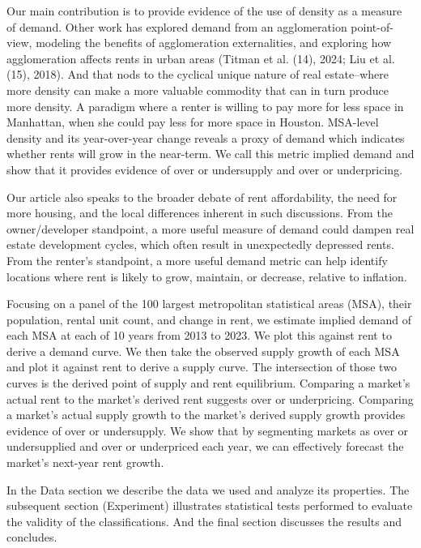 \documentclass[sn-mathphys-num]{sn-jnl}%
\theoremstyle{thmstyleone}%
\theoremstyle{thmstyletwo}%
\theoremstyle{thmstylethree}%
\begin{document}
   

Our main contribution is to provide evidence of the use of density as a measure of demand. Other work has explored demand from an agglomeration point-of-view, modeling the benefits of agglomeration externalities, and exploring how agglomeration affects rents in urban areas (Titman et al. (14), 2024; Liu et al. (15), 2018). And that nods to the cyclical unique nature of real estate--where more density can make a more valuable commodity that can in turn produce more density. A paradigm where a renter is willing to pay more for less space in Manhattan, when she could pay less for more space in Houston. MSA-level density and its year-over-year change reveals a proxy of demand which indicates whether rents will grow in the near-term. We call this metric implied demand and show that it provides evidence of over or undersupply and over or underpricing.  

   

Our article also speaks to the broader debate of rent affordability, the need for more housing, and the local differences inherent in such discussions. From the owner/developer standpoint, a more useful measure of demand could dampen real estate development cycles, which often result in unexpectedly depressed rents. From the renter's standpoint, a more useful demand metric can help identify locations where rent is likely to grow, maintain, or decrease, relative to inflation.  

   

Focusing on a panel of the 100 largest metropolitan statistical areas (MSA), their population, rental unit count, and change in rent, we estimate implied demand of each MSA at each of 10 years from 2013 to 2023. We plot this against rent to derive a demand curve. We then take the observed supply growth of each MSA and plot it against rent to derive a supply curve. The intersection of those two curves is the derived point of supply and rent equilibrium. Comparing a market's actual rent to the market's derived rent suggests over or underpricing. Comparing a market's actual supply growth to the market's derived supply growth provides evidence of over or undersupply. We show that by segmenting markets as over or undersupplied and over or underpriced each year, we can effectively forecast the market's next-year rent growth.  
  

In the Data section we describe the data we used and analyze its properties. The subsequent section (Experiment) illustrates statistical tests performed to evaluate the validity of the classifications. And the final section discusses the results and concludes. 
 
\end{document}
